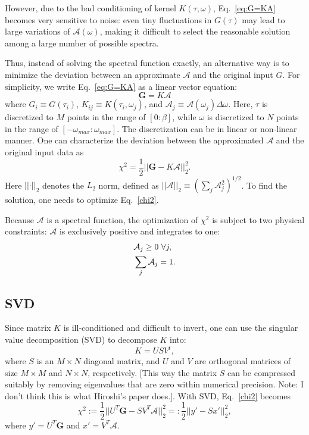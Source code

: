 \documentclass[final,5p,twocolumn,12pt]{elsarticle}
\begin{document}
However, due to the bad conditioning of kernel $K(\tau,\omega)$, Eq.~\ref{eq:G=KA} becomes very sensitive to noise: even tiny fluctuations in $G(\tau)$ may lead to large variations of $\mathcal{A}(\omega)$, making it difficult to select the reasonable solution among a large number of possible spectra. 

Thus, instead of solving the spectral function exactly, an alternative way is to minimize the deviation between an approximate $\mathcal{A}$ and the original input $G$. For simplicity, we write Eq.~\ref{eq:G=KA} as a linear vector equation: 
\begin{equation}
\boldsymbol G=K\boldsymbol{\mathcal{A}}
\label{G=KA}
\end{equation}
where $G_i\equiv G(\tau_i)$, $K_{ij}\equiv K(\tau_i,\omega_j)$, and $\mathcal{A}_j \equiv \mathcal{A}(\omega_j)\Delta\omega$. Here, $\tau$ is discretized to $M$ points in the range of $[0:\beta]$, while $\omega$ is discretized to $N$ points in the range of $[-\omega_{max}:\omega_{max}]$. The discretization can be in linear or non-linear manner. One can characterize the deviation between the approximated $\mathcal{A}$ and the original input data as 
\begin{equation}
\chi^2=\frac{1}{2}\lvert\lvert \boldsymbol G-K\boldsymbol{\mathcal{A}} \rvert\rvert^{2}_{2}. 
\label{chi2}
\end{equation}
Here $\lvert\lvert\cdot\rvert\rvert_2$ denotes the $L_2$ norm, defined as $\lvert\lvert \boldsymbol{\mathcal{A}}\rvert\rvert_2\equiv (\sum_j\mathcal{A}^2_j)^{1/2}$. To find the solution, one needs to optimize Eq.~\ref{chi2}. 

Because $\boldsymbol{\mathcal{A}}$ is a spectral function, the optimization of $\chi^2$ is subject to two physical constraints: $\boldsymbol{\mathcal{A}}$ is exclusively positive and integrates to one: 
\begin{align}
&\mathcal{A}_j \geq 0 \thinspace \thinspace \forall j, \label{positivity}\\
&\sum_j\mathcal{A}_j=1. \label{norm}
\end{align}

\subsection{SVD}
Since matrix $K$ is ill-conditioned and difficult to invert, one can use the singular value decomposition (SVD) to decompose $K$ into: 
\begin{equation}
K=USV^t,
\label{svd}
\end{equation}
where $S$ is an $M\times N$ diagonal matrix, and $U$ and $V$ are orthogonal matrices of size $M\times M$ and $N\times N$, respectively. [This way the matrix $S$ can be compressed suitably by removing eigenvalues that are zero within numerical precision. Note: I don't think this is what Hiroshi's paper does.]. With SVD, Eq.~\ref{chi2} becomes
\begin{equation}
\chi^2 := \frac{1}{2}\lvert\lvert U^T \boldsymbol G-SV^T\boldsymbol{\mathcal{A}} \rvert\rvert^{2}_{2} =:\frac{1}{2}\lvert\lvert y'-Sx'\rvert\rvert^{2}_{2},
\label{chi2v2}
\end{equation}
where $y'=U^T\boldsymbol G$ and $x'=V^T\boldsymbol{\mathcal{A}}$. 
\end{document}
